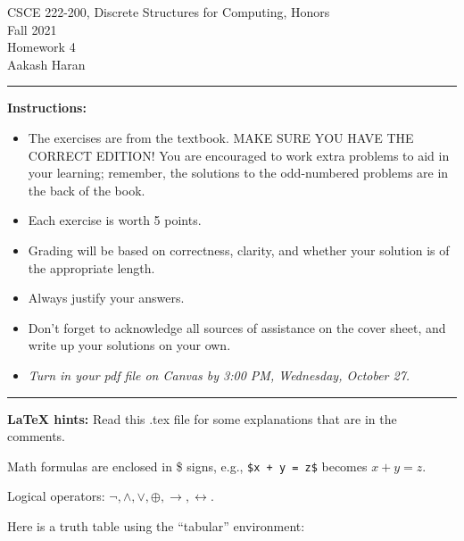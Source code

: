 \documentclass[12pt]{article}  %
\newcommand{\NOT}{\neg}
\newcommand{\AND}{\wedge}
\newcommand{\OR}{\vee}
\newcommand{\XOR}{\oplus}
\newcommand{\IMPLIES}{\rightarrow}
\newcommand{\IFF}{\leftrightarrow}
\begin{document}
\begin{center}         %
{\large                %
CSCE 222-200, Discrete Structures for Computing, Honors \\  %
Fall 2021 \\
Homework 4 \\
Aakash Haran}
\end{center}


\rule{6in}{.1pt}       %
                    
\noindent              %
{\bf Instructions:}    %

\begin{itemize}        %
\item The exercises are from the textbook.  MAKE SURE YOU HAVE THE CORRECT
      EDITION!  You are encouraged to work
      extra problems to aid in your learning; remember, the solutions to 
      the odd-numbered problems are in the back of the book.
\item Each exercise is worth 5 points.
\item Grading will be based on correctness, clarity, and whether your
      solution is of the appropriate length.
\item Always justify your answers. 
\item Don't forget to acknowledge all sources of assistance on the cover
      sheet, and write up your solutions on your own.
\item {\em Turn in your pdf file on Canvas by 3:00 PM, Wednesday, October 27.}
\end{itemize}

\rule{6in}{.1pt}       %

\noindent
{\bf LaTeX hints:}  Read this .tex file for some explanations that are in
the comments.

Math formulas are enclosed in \$ signs, e.g., {\tt \$x + y = z\$}
becomes $x + y = z$.

Logical operators: $\NOT, \AND, \OR, \XOR, \IMPLIES, \IFF$.

Here is a truth table using the ``tabular'' environment:
\end{document}
